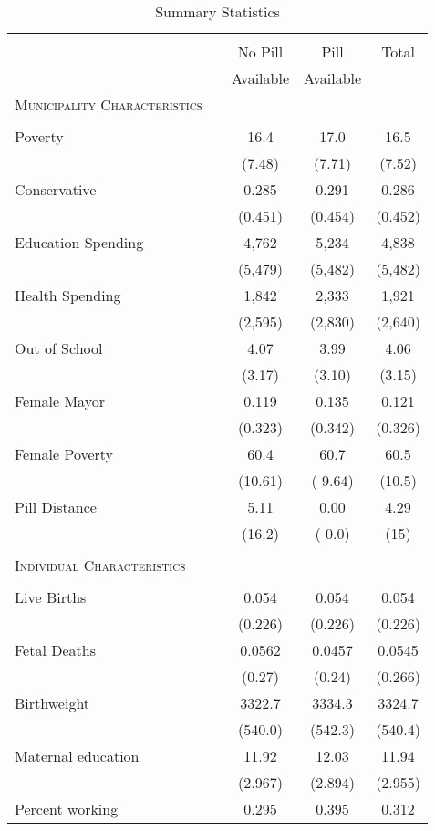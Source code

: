 \begin{table}[htpb!] \centering
\caption{Summary Statistics} \label{TEENtab:SumStats}
\begin{tabular} {@{\extracolsep{5pt}}lp{1cm}ccc}\\ [-1.8ex]
\hline\hline\\ [-1.8ex] &&No Pill&Pill&Total \\
&&Available&Available& \\ \midrule 
\textsc{Municipality Characteristics} &&&& \\
&&&& \\
Poverty &&16.4&17.0&16.5\\
&&(7.48)&(7.71)&(7.52) \\
Conservative &&0.285&0.291&0.286\\
&&(0.451)&(0.454)&(0.452) \\
Education Spending &&4,762&5,234&4,838\\
&&(5,479)&(5,482)&(5,482) \\
Health Spending &&1,842&2,333&1,921\\
&&(2,595)&(2,830)&(2,640) \\
Out of School &&4.07&3.99&4.06\\
&&(3.17)&(3.10)&(3.15) \\
Female Mayor &&0.119&0.135&0.121\\
&&(0.323)&(0.342)&(0.326) \\
Female Poverty &&60.4&60.7&60.5\\
&&(10.61)&( 9.64)&(10.5) \\
Pill Distance &&5.11&0.00&4.29\\
&&(16.2)&( 0.0)&(15) \\
&&&& \\
\textsc{Individual Characteristics} &&&& \\
&&&& \\
Live Births &&0.054&0.054&0.054\\
&&(0.226)&(0.226)&(0.226) \\
Fetal Deaths &&0.0562&0.0457&0.0545\\
&&(0.27)&(0.24)&(0.266) \\
Birthweight &&3322.7&3334.3&3324.7\\
&&     (540.0)&     (542.3)&     (540.4)\\
Maternal education  &&       11.92&       12.03&       11.94\\
&&     (2.967)&     (2.894)&     (2.955)\\
Percent working     &&       0.295&       0.395&       0.312\\

\end{tabular}
\end{table}
